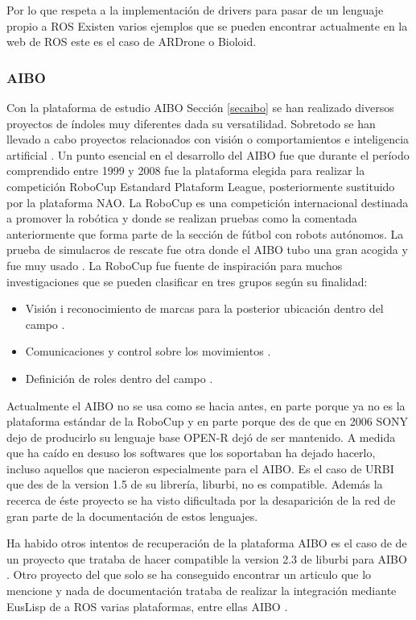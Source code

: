 \documentclass[12pt,a4paper,final,twoside]{book}
\begin{document}
Por lo que respeta a la implementación de drivers para pasar de un lenguaje propio a ROS Existen varios ejemplos que se pueden encontrar actualmente en la web de ROS este es el caso de ARDrone o Bioloid. 

\subsubsection{AIBO}

Con la plataforma de estudio AIBO Sección \ref{secaibo} se han realizado diversos proyectos de índoles muy diferentes dada su versatilidad. Sobretodo se han llevado a cabo proyectos relacionados con visión \cite{xavi} o comportamientos e inteligencia artificial \cite{riki}.
Un punto esencial en el desarrollo del AIBO fue que durante el período comprendido entre 1999 y 2008 fue la plataforma elegida para realizar la competición RoboCup Estandard Plataform League, posteriormente sustituido por la plataforma NAO. La RoboCup es una competición internacional destinada a promover la robótica y donde se realizan pruebas como la comentada anteriormente que forma parte de la sección de fútbol con robots autónomos. La prueba de simulacros de rescate fue otra donde el AIBO tubo una gran acogida y fue muy usado \cite{robocup}.
La RoboCup fue fuente de inspiración para muchos investigaciones que se pueden clasificar en tres grupos según su finalidad:
\begin{itemize}
\item Visión i reconocimiento de marcas para la posterior ubicación dentro del campo \cite{morales}.
\item Comunicaciones y control sobre los movimientos \cite{jesus}.
\item Definición de roles dentro del campo \cite{metod}.
\end{itemize}

Actualmente el AIBO no se usa como se hacia antes, en parte porque ya no es la plataforma estándar de la RoboCup y en parte porque des de que en 2006 SONY dejo de producirlo su lenguaje base OPEN-R\cite{OPEN-R PG} dejó de ser mantenido.
A medida que ha caído en desuso los softwares que los soportaban ha dejado hacerlo, incluso aquellos que nacieron especialmente para el AIBO. Es el caso de URBI que des de la version 1.5 de su librería, liburbi, no es compatible.
Además la recerca de éste proyecto se ha visto dificultada por la desaparición de la red de gran parte de la documentación de estos lenguajes.

Ha habido otros intentos de recuperación de la plataforma AIBO es el caso de de un proyecto que trataba de hacer compatible la version 2.3 de liburbi para AIBO \cite{kecsap}.
Otro proyecto del que solo se ha conseguido encontrar un articulo que lo mencione y nada de documentación  trataba de realizar la integración mediante EusLisp de a ROS varias plataformas, entre ellas AIBO \cite{euslisp}.
\end{document}

